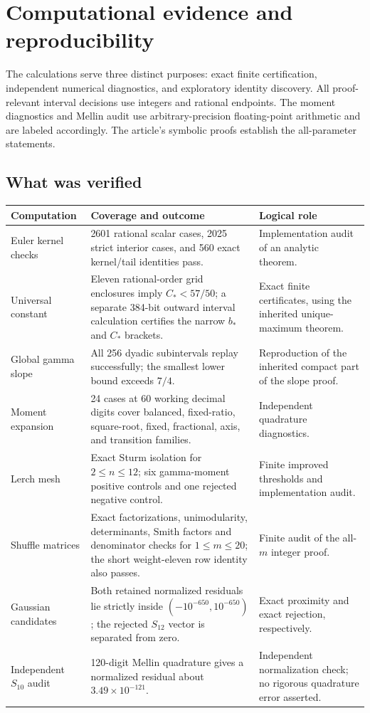 \section{Computational evidence and reproducibility}
\label{sec:computation}

The calculations serve three distinct purposes: exact finite
certification, independent numerical diagnostics, and exploratory
identity discovery. All proof-relevant interval decisions use integers
and rational endpoints. The moment diagnostics and Mellin audit use
arbitrary-precision floating-point arithmetic and are labeled accordingly.
The article's symbolic proofs establish the all-parameter statements.

\subsection{What was verified}

\begin{longtable}{@{}P{0.23\textwidth}P{0.47\textwidth}P{0.24\textwidth}@{}}
\toprule
Computation & Coverage and outcome & Logical role\\
\midrule
\endhead
Euler kernel checks & 2601 rational scalar cases, 2025 strict interior
cases, and 560 exact kernel/tail identities pass. & Implementation
audit of an analytic theorem.\\
Universal constant & Eleven rational-order grid enclosures imply
$C_*<57/50$; a separate 384-bit outward interval calculation certifies
the narrow $b_*$ and $C_*$ brackets. & Exact finite certificates, using
the inherited unique-maximum theorem.\\
Global gamma slope & All 256 dyadic subintervals replay successfully;
the smallest lower bound exceeds $7/4$. & Reproduction of the inherited
compact part of the slope proof.\\
Moment expansion & 24 cases at 60 working decimal digits cover balanced,
fixed-ratio, square-root, fixed, fractional, axis, and transition families.
& Independent quadrature diagnostics.\\
Lerch mesh & Exact Sturm isolation for $2\le n\le12$; six gamma-moment
positive controls and one rejected negative control. & Finite improved
thresholds and implementation audit.\\
Shuffle matrices & Exact factorizations, unimodularity, determinants,
Smith factors and denominator checks for $1\le m\le20$; the short
weight-eleven row identity also passes. & Finite audit of the all-$m$
integer proof.\\
Gaussian candidates & Both retained normalized residuals lie strictly
inside $(-10^{-650},10^{-650})$; the rejected $S_{12}$ vector is separated
from zero. & Exact proximity and exact rejection, respectively.\\
Independent $S_{10}$ audit & 120-digit Mellin quadrature gives a normalized
residual about $3.49\times10^{-121}$. & Independent normalization check;
no rigorous quadrature error asserted.\\
\bottomrule
\end{longtable}

